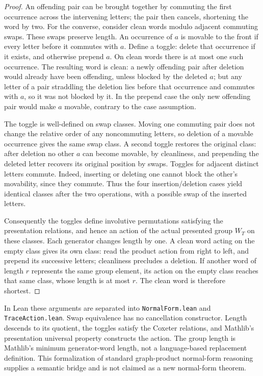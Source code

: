 \documentclass[11pt]{article}
\begin{document}
\begin{proof}
An offending pair can be brought together by commuting the first occurrence across the intervening letters; the pair then cancels, shortening the word by two.
For the converse, consider clean words modulo adjacent commuting swaps. These swaps preserve length. An occurrence of \(a\) is movable to the front if every letter before it commutes with \(a\). Define a toggle: delete that occurrence if it exists, and otherwise prepend \(a\). On clean words there is at most one such occurrence. The resulting word is clean: a newly offending pair after deletion would already have been offending, unless blocked by the deleted \(a\); but any letter of a pair straddling the deletion lies before that occurrence and commutes with \(a\), so it was not blocked by it. In the prepend case the only new offending pair would make \(a\) movable, contrary to the case assumption.

The toggle is well-defined on swap classes. Moving one commuting pair does not change the relative order of any noncommuting letters, so deletion of a movable occurrence gives the same swap class. A second toggle restores the original class: after deletion no other \(a\) can become movable, by cleanliness, and prepending the deleted letter recovers its original position by swaps. Toggles for adjacent distinct letters commute. Indeed, inserting or deleting one cannot block the other's movability, since they commute. Thus the four insertion/deletion cases yield identical classes after the two operations, with a possible swap of the inserted letters.

Consequently the toggles define involutive permutations satisfying the presentation relations, and hence an action of the actual presented group \(W_T\) on these classes. Each generator changes length by one. A clean word acting on the empty class gives its own class: read the product action from right to left, and prepend its successive letters; cleanliness precludes a deletion. If another word of length \(r\) represents the same group element, its action on the empty class reaches that same class, whose length is at most \(r\). The clean word is therefore shortest.
\end{proof}
In Lean these arguments are separated into \texttt{NormalForm.lean} and \texttt{TraceAction.lean}. Swap equivalence has no cancellation constructor. Length descends to its quotient, the toggles satisfy the Coxeter relations, and Mathlib's presentation universal property constructs the action. The group length is Mathlib's minimum generator-word length, not a language-based replacement definition. This formalization of standard graph-product normal-form reasoning supplies a semantic bridge and is not claimed as a new normal-form theorem.
\newpage
\end{document}

